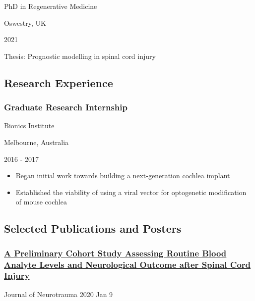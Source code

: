 \documentclass[
]{article}
\providecommand{\tightlist}{%
  \setlength{\itemsep}{0pt}\setlength{\parskip}{0pt}}
\begin{document}
PhD in Regenerative Medicine

Oswestry, UK

2021

Thesis: Prognostic modelling in spinal cord injury

\hypertarget{research-experience}{%
\subsection{Research Experience}\label{research-experience}}

\hypertarget{graduate-research-internship}{%
\subsubsection{Graduate Research
Internship}\label{graduate-research-internship}}

Bionics Institute

Melbourne, Australia

2016 - 2017

\begin{itemize}
\tightlist
\item
  Began initial work towards building a next-generation cochlea implant
\item
  Established the viability of using a viral vector for optogenetic
  modification of mouse cochlea
\end{itemize}

\hypertarget{selected-publications-and-posters}{%
\subsection{Selected Publications and
Posters}\label{selected-publications-and-posters}}

\hypertarget{a-preliminary-cohort-study-assessing-routine-blood-analyte-levels-and-neurological-outcome-after-spinal-cord-injury}{%
\subsubsection{\texorpdfstring{\href{https://doi.org/10.1089/neu.2019.6495}{A
Preliminary Cohort Study Assessing Routine Blood Analyte Levels and
Neurological Outcome after Spinal Cord
Injury}}{A Preliminary Cohort Study Assessing Routine Blood Analyte Levels and Neurological Outcome after Spinal Cord Injury}}\label{a-preliminary-cohort-study-assessing-routine-blood-analyte-levels-and-neurological-outcome-after-spinal-cord-injury}}

Journal of Neurotrauma 2020 Jan 9
\end{document}
